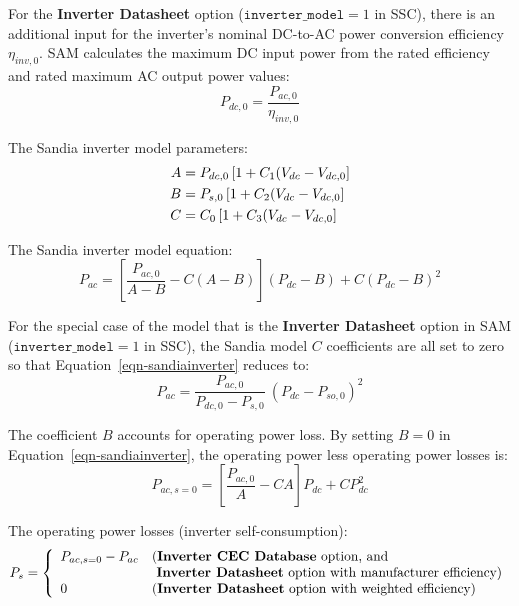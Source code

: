 \documentclass[12pt,letterpaper]{article}
\begin{document}
For the \textbf{Inverter Datasheet} option ($\mathtt{inverter\_model}=1$ in SSC), there is an additional input for the inverter's nominal DC-to-AC power conversion efficiency $\eta_{inv,0}$. SAM calculates the maximum DC input power from the rated efficiency and rated maximum AC output power values:
\begin{equation}
P_{dc,0} = \frac{P_{ac,0}}{\eta_{inv,0}}
\end{equation}

The Sandia inverter model parameters:
\begin{align}
A &=P_{dc,0} \left[ 1+ C_1 ( V_{dc} - V_{dc,0}\right] \notag\\
B &= P_{s,0}  \left[ 1+ C_2 ( V_{dc} - V_{dc,0}\right] \notag\\
C &= C_0  \left[ 1+ C_3 ( V_{dc} - V_{dc,0}\right]
\end{align}

The Sandia inverter model equation:
\begin{equation}\label{eqn-sandiainverter}
P_{ac} = \left[ \frac{P_{ac,0}}{A-B} - C ( A - B ) \right] ( P_{dc} - B ) + C ( P_{dc} - B )^2
\end{equation}

For the special case of the model that is the \textbf{Inverter Datasheet} option in SAM ($\mathtt{inverter\_model} = 1$ in SSC), the Sandia model $C$ coefficients are all set to zero so that Equation~\ref{eqn-sandiainverter} reduces to:
\begin{equation}
P_{ac} = \frac{P_{ac,0}}{P_{dc,0}-P_{s,0}}~( P_{dc} - P_{so,0} )^2
\end{equation}

The coefficient $B$ accounts for operating power loss. By setting $B=0$ in Equation~\ref{eqn-sandiainverter}, the operating power less operating power losses is:
\begin{equation}
P_{ac,s=0} = \left[ \frac{P_{ac,0}}{A} - C A \right] P_{dc} + C P_{dc}^2
\end{equation}

The operating power losses (inverter self-consumption):
\begin{equation}
P_{s} = \left\{
\begin{array}{ll}
P_{ac,s=0} - P_{ac} & \text{(\textbf{Inverter CEC Database} option, and } \\
 & \text{~\textbf{Inverter Datasheet} option with manufacturer efficiency)} \\
0 & \text{(\textbf{Inverter Datasheet} option with weighted efficiency)}
\end{array}
\right.
\end{equation}
\end{document}
